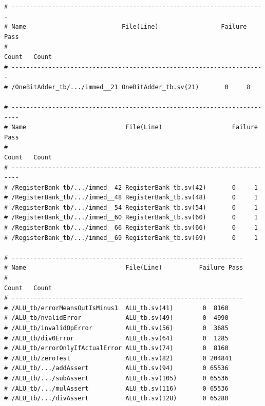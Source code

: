 \documentclass[a4paper]{article}
\begin{document}
\begin{verbatim}
# ---------------------------------------------------------------------
# Name                          File(Line)                 Failure Pass
#                                                                                                              Count   Count
# ---------------------------------------------------------------------
# /OneBitAdder_tb/.../immed__21 OneBitAdder_tb.sv(21)       0     8

# ------------------------------------------------------------------------
# Name                           File(Line)                   Failure Pass
#                                                                                                                                                  Count   Count
# ------------------------------------------------------------------------
# /RegisterBank_tb/.../immed__42 RegisterBank_tb.sv(42)       0     1
# /RegisterBank_tb/.../immed__48 RegisterBank_tb.sv(48)       0     1
# /RegisterBank_tb/.../immed__54 RegisterBank_tb.sv(54)       0     1
# /RegisterBank_tb/.../immed__60 RegisterBank_tb.sv(60)       0     1
# /RegisterBank_tb/.../immed__66 RegisterBank_tb.sv(66)       0     1
# /RegisterBank_tb/.../immed__69 RegisterBank_tb.sv(69)       0     1

# ---------------------------------------------------------------
# Name                           File(Line)          Failure Pass
#                                                                                                                           Count   Count
# ---------------------------------------------------------------
# /ALU_tb/errorMeansOutIsMinus1  ALU_tb.sv(41)        0  8160
# /ALU_tb/nvalidError            ALU_tb.sv(49)        0  4990
# /ALU_tb/invalidOpError         ALU_tb.sv(56)        0  3685
# /ALU_tb/div0Error              ALU_tb.sv(64)        0  1285
# /ALU_tb/errorOnlyIfActualError ALU_tb.sv(74)        0  8160
# /ALU_tb/zeroTest               ALU_tb.sv(82)        0 204841
# /ALU_tb/.../addAssert          ALU_tb.sv(94)        0 65536
# /ALU_tb/.../subAssert          ALU_tb.sv(105)       0 65536
# /ALU_tb/.../mulAssert          ALU_tb.sv(116)       0 65536
# /ALU_tb/.../divAssert          ALU_tb.sv(128)       0 65280


\end{verbatim}
\end{document}
